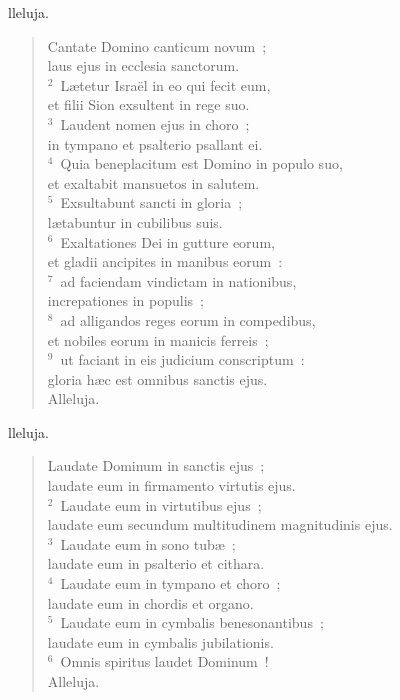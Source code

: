 \bchapter
{}lleluja. \begin{flushleft}\begin{verse}\vspace{6pt}Cantate Domino canticum novum~;\\ laus ejus in ecclesia sanctorum.\\
${}^{2}$~L\ae tetur Isra\"el in eo qui fecit eum,\\ et filii Sion exsultent in rege suo.\\
${}^{3}$~Laudent nomen ejus in choro~;\\ in tympano et psalterio psallant ei.\\
${}^{4}$~Quia beneplacitum est Domino in populo suo,\\ et exaltabit mansuetos in salutem.\\
${}^{5}$~Exsultabunt sancti in gloria~;\\ l\ae tabuntur in cubilibus suis.\\
${}^{6}$~Exaltationes Dei in gutture eorum,\\ et gladii ancipites in manibus eorum~:\\
${}^{7}$~ad faciendam vindictam in nationibus,\\ increpationes in populis~;\\
${}^{8}$~ad alligandos reges eorum in compedibus,\\ et nobiles eorum in manicis ferreis~;\\
${}^{9}$~ut faciant in eis judicium conscriptum~:\\ gloria h\ae c est omnibus sanctis ejus.\\ Alleluja.\end{verse}\end{flushleft}



\bchapter
{}lleluja. \begin{flushleft}\begin{verse}\vspace{6pt}Laudate Dominum in sanctis ejus~;\\ laudate eum in firmamento virtutis ejus.\\
${}^{2}$~Laudate eum in virtutibus ejus~;\\ laudate eum secundum multitudinem magnitudinis ejus.\\
${}^{3}$~Laudate eum in sono tub\ae~;\\ laudate eum in psalterio et cithara.\\
${}^{4}$~Laudate eum in tympano et choro~;\\ laudate eum in chordis et organo.\\
${}^{5}$~Laudate eum in cymbalis benesonantibus~;\\ laudate eum in cymbalis jubilationis.\\
${}^{6}$~Omnis spiritus laudet Dominum~!\\ Alleluja.\end{verse}\end{flushleft}


